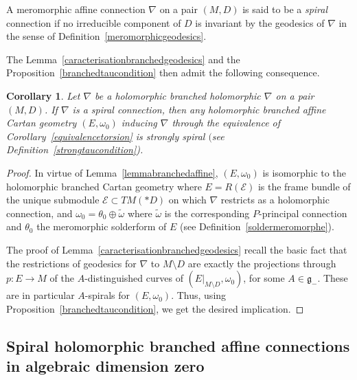 \documentclass[pdftex]{sigma}
\numberwithin{equation}{section}
\newtheorem{Corollary}[Theorem]{Corollary}
\begin{document}
\begin{Definition}\label{tauconnection} A meromorphic affine connection $\nabla$ on a pair $(M,D)$ is said to be a \textit{spiral} connection if no irreducible component of $D$ is invariant by the geodesics of $\nabla$ in the sense of Definition~\ref{meromorphicgeodesics}. \end{Definition}

The Lemma~\ref{caracterisationbranchedgeodesics} and the Proposition~\ref{branchedtaucondition} then admit the following consequence.

\begin{Corollary}\label{tauconnectionstaucondition} Let $\nabla$ be a holomorphic branched holomorphic $\nabla$ on a pair $(M,D)$. If $\nabla$ is a spiral connection, then any holomorphic branched affine Cartan geometry $(E,\omega_0)$ inducing $\nabla$ through the equivalence of Corollary~{\rm \ref{equivalencetorsion}} is strongly spiral $($see Definition~{\rm \ref{strongtaucondition})}. \end{Corollary}
\begin{proof} In virtue of Lemma~\ref{lemmabranchedaffine}, $(E,\omega_0)$ is isomorphic to the holomorphic branched Cartan geometry where $E=R(\mathcal{E})$ is the frame bundle of the unique submodule $\mathcal{E}\subset TM(* D)$ on which $\nabla$ restricts as a holomorphic connection, and $\omega_0=\theta_0 \oplus \tilde{\omega}$ where $\tilde{\omega}$ is the corresponding $P$-principal connection and $\theta_0$ the meromorphic solderform of $E$ (see Definition~\ref{soldermeromorphe}).

The proof of Lemma~\ref{caracterisationbranchedgeodesics} recall the basic fact that the restrictions of geodesics for $\nabla$ to $M\setminus D$ are exactly the projections through $p\colon E\longrightarrow M$ of the $A$-distinguished curves of $(E|_{M\setminus D},\omega_0)$, for some $A\in \mathfrak{g}_-$. These are in particular $A$-spirals for $(E,\omega_0)$. Thus, using Proposition~\ref{branchedtaucondition}, we get the desired implication. \end{proof}

\subsection[Spiral holomorphic branched affine connections in algebraic dimension zero]{Spiral holomorphic branched affine connections \\ in algebraic dimension zero}
\end{document}
